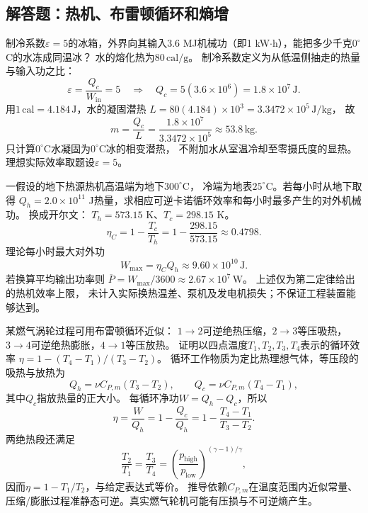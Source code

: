 \subsection{解答题：热机、布雷顿循环和熵增}

\problemtext 制冷系数$\varepsilon=5$的冰箱，外界向其输入3.6 MJ机械功（即1 kW$\cdot$h），能把多少千克$0^\circ$C的水冻成同温冰？
水的熔化热为$80\,\mathrm{cal/g}$。
\workings
制冷系数定义为从低温侧抽走的热量与输入功之比：
\[
\varepsilon=\frac{Q_c}{W_{\mathrm{in}}}=5
\quad\Longrightarrow\quad
Q_c=5(3.6\times10^6)=1.8\times10^7\,\mathrm J.
\]
用$1\,\mathrm{cal}=4.184\,\mathrm J$，水的凝固潜热
$L=80(4.184)\times10^3=3.3472\times10^5\,\mathrm{J/kg}$，
故
\[
\boxed{m=\frac{Q_c}{L}
=\frac{1.8\times10^7}{3.3472\times10^5}
\approx53.8\,\mathrm{kg}}.
\]
\crosscheck 只计算$0^\circ$C水凝固为$0^\circ$C冰的相变潜热，
不附加水从室温冷却至零摄氏度的显热。理想实际效率取题设$\varepsilon=5$。

\problemtext 一假设的地下热源热机高温端为地下$300^\circ$C，
冷端为地表$25^\circ$C。若每小时从地下取得
$Q_h=2.0\times10^{11}$ J热量，求相应可逆卡诺循环效率和每小时最多产生的对外机械功。
\workings
换成开尔文：
$T_h=573.15$ K、$T_c=298.15$ K。
\[
\boxed{\eta_C=1-\frac{T_c}{T_h}
=1-\frac{298.15}{573.15}
\approx0.4798}.
\]
理论每小时最大对外功
\[
\boxed{W_{\max}=\eta_CQ_h
\approx9.60\times10^{10}\,\mathrm J}.
\]
若换算平均输出功率则
$\overline P=W_{\max}/3600\approx2.67\times10^7\,\mathrm W$。
\crosscheck 上述仅为第二定律给出的热机效率上限，
未计入实际换热温差、泵机及发电机损失；不保证工程装置能够达到。

\problemtext 某燃气涡轮过程可用布雷顿循环近似：
$1\to2$可逆绝热压缩，$2\to3$等压吸热，
$3\to4$可逆绝热膨胀，$4\to1$等压放热。
证明以四点温度$T_1,T_2,T_3,T_4$表示的循环效率
$\eta=1-(T_4-T_1)/(T_3-T_2)$。
\workings
循环工作物质为定比热理想气体，等压段的吸热与放热为
\[
Q_h=\nu C_{P,m}(T_3-T_2),\qquad
Q_c=\nu C_{P,m}(T_4-T_1),
\]
其中$Q_c$指放热量的正大小。
每循环净功$W=Q_h-Q_c$，所以
\[
\boxed{\eta=\frac{W}{Q_h}
=1-\frac{Q_c}{Q_h}
=1-\frac{T_4-T_1}{T_3-T_2}}.
\]
两绝热段还满足
\[
\frac{T_2}{T_1}=
\frac{T_3}{T_4}=
\left(\frac{p_{\mathrm{high}}}{p_{\mathrm{low}}}
\right)^{(\gamma-1)/\gamma},
\]
因而$\eta=1-T_1/T_2$，与给定表达式等价。
\crosscheck 推导依赖$C_{P,m}$在温度范围内近似常量、
压缩/膨胀过程准静态可逆。真实燃气轮机可能有压损与不可逆熵产生。

